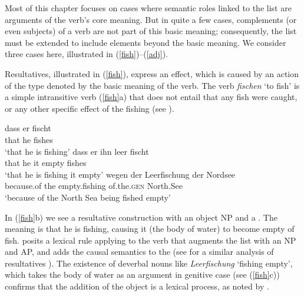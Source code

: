 \documentclass[output=paper
 	        ,biblatex
                ,babelshorthands
                ,newtxmath
                ,draftmode
                ,colorlinks, citecolor=brown
]{langscibook}
\begin{document}
Most of this chapter focuses on cases where semantic roles linked to the \argst list are arguments of the verb's core meaning. But in quite a few cases, complements (or even subjects) of a verb are not part of this basic meaning; consequently, the \argst list must be extended to include elements beyond the basic meaning. We consider three cases here, illustrated in (\ref{fish})--(\ref{adj}).  

Resultatives, illustrated in (\ref{fish}), express an effect, which is caused by an action of the type denoted by the basic meaning of the verb. The verb \textit{fischen} `to fish' is a simple intransitive verb (\ref{fish}a) that does not entail that any fish were caught, or any other specific effect of the fishing (see \citealt[219--220]{Mueller2002b}).  

\begin{exe}
\ex\label{fish}
\begin{xlist}
\ex
\gll dass er  fischt\\
     that he  fishes\\
\glt `that he is fishing'
\ex 
\gll dass er ihn leer fischt\\
     that he it empty fishes\\
\glt `that he is fishing it empty'
\ex 
\gll wegen der Leerfischung der Nordsee\footnotemark\\
     because.of the empty.fishing of.the.\textsc{gen} North.See \\
\glt `because of the North Sea being fished empty'
\end{xlist}
\end{exe}

\noindent
 In (\ref{fish}b) we see a resultative construction\del{,} with an object NP and a .  The meaning is that he is fishing, causing it (the body of water) to become empty of fish.  \citet[241]{Mueller2002b} posits a lexical rule  applying to the verb that augments the \argst list with an NP and AP, and adds the causal semantics to the \content (see \citealt{Wechsler2005result} for a similar analysis of  resultatives ).     The existence of deverbal nouns like \textit{Leerfischung} `fishing empty', which takes the body of water as an argument in genitive case (see (\ref{fish}c)) confirms that the addition of the object is a lexical process, as noted by \citet{Mueller2002b}.  
\end{document}
